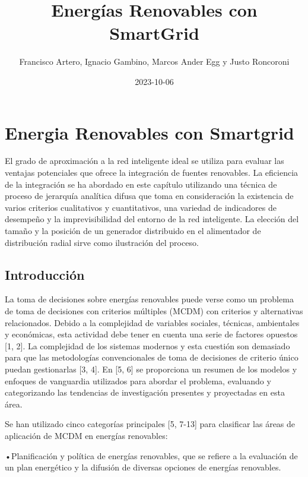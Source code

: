\documentclass[
]{article}
\title{Energías Renovables con SmartGrid}
\author{Francisco Artero, Ignacio Gambino, Marcos Ander Egg y Justo
Roncoroni}
\date{2023-10-06}
\begin{document}
\maketitle

\hypertarget{energia-renovables-con-smartgrid}{%
\section{Energia Renovables con
Smartgrid}\label{energia-renovables-con-smartgrid}}

El grado de aproximación a la red inteligente ideal se utiliza para
evaluar las ventajas potenciales que ofrece la integración de fuentes
renovables. La eficiencia de la integración se ha abordado en este
capítulo utilizando una técnica de proceso de jerarquía analítica difusa
que toma en consideración la existencia de varios criterios cualitativos
y cuantitativos, una variedad de indicadores de desempeño y la
imprevisibilidad del entorno de la red inteligente. La elección del
tamaño y la posición de un generador distribuido en el alimentador de
distribución radial sirve como ilustración del proceso.

\hypertarget{introducciuxf3n}{%
\subsection{Introducción}\label{introducciuxf3n}}

La toma de decisiones sobre energías renovables puede verse como un
problema de toma de decisiones con criterios múltiples (MCDM) con
criterios y alternativas relacionados. Debido a la complejidad de
variables sociales, técnicas, ambientales y económicas, esta actividad
debe tener en cuenta una serie de factores opuestos {[}1, 2{]}. La
complejidad de los sistemas modernos y esta cuestión son demasiado para
que las metodologías convencionales de toma de decisiones de criterio
único puedan gestionarlas {[}3, 4{]}. En {[}5, 6{]} se proporciona un
resumen de los modelos y enfoques de vanguardia utilizados para abordar
el problema, evaluando y categorizando las tendencias de investigación
presentes y proyectadas en esta área.

Se han utilizado cinco categorías principales {[}5, 7-13{]} para
clasificar las áreas de aplicación de MCDM en energías renovables:

•Planificación y política de energías renovables, que se refiere a la
evaluación de un plan energético y la difusión de diversas opciones de
energías renovables.
\end{document}
